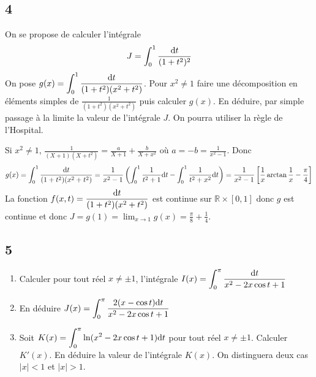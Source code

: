 \documentclass{article}[11pt]
\def \de {{\rm d}}
\begin{document}
\subsection*{4}
{\color{blue}
On se propose de calculer l'intégrale 
\[J=\int_0^1\frac{\de t}{(1+t^2)^2}\]
On pose $g(x)=\displaystyle \int_0^1\frac{\de t}{(1+t^2)(x^2+t^2)}$. Pour $x^2\neq 1$ faire une décomposition en éléments simples de $\displaystyle \frac{1}{(1+t^2)(x^2+t^2)}$ puis calculer $g(x)$. En déduire, par simple passage à la limite la valeur de l'intégrale $J$. On pourra utiliser la règle de l'Hospital.
}

Si $x^2\neq 1$, $\displaystyle \frac{1}{(X+1)(X+t^2)}=\frac{a}{X+1}+\frac{b}{X+x^2}$ où $a=-b=\frac{1}{x^2-1}$. Donc
\[g(x)=\int_0^1\frac{\de t}{(1+t^2)(x^2+t^2)}=\frac{1}{x^2-1}\left(\int_0^1\frac{1}{t^2+1}\de t-\int_0^1\frac{1}{t^2+x^2}\de t\right)=\frac{1}{x^2-1}\left[\frac 1x\arctan\frac 1x-\frac{\pi}{4}\right]\]
La fonction $\displaystyle  f(x,t)=\frac{\de t}{(1+t^2)(x^2+t^2)}$ est continue sur $\mathbb{R}\times [0,1]$ donc $g$ est continue et donc $J=g(1)=\lim_{x\to 1}g(x)=\frac{\pi}{8}+\frac{1}{4}$.
\subsection*{5}
{\color{blue}
\begin{enumerate}
\item Calculer pour tout réel $x\neq \pm1$, l'intégrale $I(x)=\displaystyle \int_{0}^{\pi}\frac{\de t}{x^2-2x\cos t+1}$ 
\item En déduire $J(x)=\displaystyle \int_{0}^{\pi}\frac{2(x-\cos t)\de t}{x^2-2x\cos t+1}$ 
\item Soit $K(x)=\displaystyle \int_{0}^{\pi}\ln(x^2-2x\cos t+1)\de t$ pour tout réel $x\neq \pm1$.  Calculer $K'(x)$. En déduire la valeur de l'intégrale $K(x)$. On distinguera deux cas $|x|<1$ et $|x|>1$. 
\end{enumerate}
}
\end{document}
